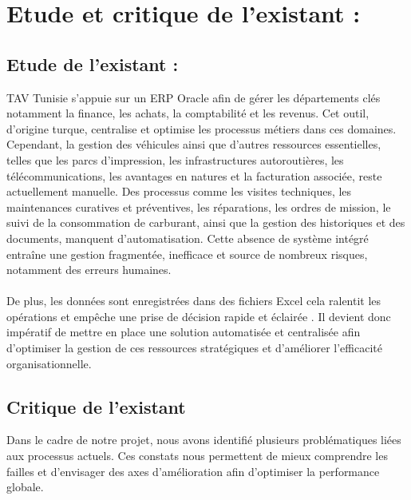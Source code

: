 \documentclass[a4paper,11pt]{report}
\begin{document}
\section{Etude et critique de l'existant : }

\subsection{Etude de l'existant :}

TAV Tunisie s'appuie sur un ERP Oracle afin de gérer les départements clés notamment la finance, les achats, la comptabilité et les revenus. Cet outil, d'origine turque, centralise et optimise les processus métiers dans ces domaines.
\newline
\\
Cependant, la gestion des véhicules ainsi que d'autres ressources essentielles, telles que les parcs d'impression, les infrastructures autoroutières, les télécommunications, les avantages en natures et la facturation associée, reste actuellement manuelle. Des processus comme les visites techniques, les maintenances curatives et préventives, les réparations, les ordres de mission, le suivi de la consommation de carburant, ainsi que la gestion des historiques et des documents, manquent d'automatisation. Cette absence de système intégré entraîne une gestion fragmentée, inefficace et source de nombreux risques, notamment des erreurs humaines.
\\
\\
De plus, les données sont enregistrées dans des fichiers Excel cela ralentit les opérations et empêche une prise de décision rapide et éclairée . Il devient donc impératif de mettre en place une solution automatisée et centralisée afin d'optimiser la gestion de ces ressources stratégiques et d'améliorer l'efficacité organisationnelle. 

\subsection{Critique de l'existant}

Dans le cadre de notre projet, nous avons identifié plusieurs problématiques liées aux processus actuels. Ces constats nous permettent de mieux comprendre les failles et d'envisager des axes d'amélioration afin d'optimiser la performance globale.
\end{document}
